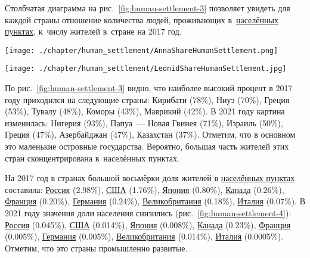 Столбчатая диаграмма на рис.~\ref{fig:human-settlement-3} позволяет увидеть для каждой страны 
отношение количества людей, 
проживающих в~\href{http://www.wikidata.org/entity/Q486972}{населённых пунктах}, 
к~числу жителей в~стране на 2017 год.

\begin{figure*}
    \texttt{[image: ./chapter/human\_settlement/AnnaShareHumanSettlement.png]}
	\label{fig:human-settlement-3}
	\caption[Диаграмма доли населения страны, 2017.]{Диаграмма доли населения страны, проживающего в <<населённых пунктах>> на 2017 год. Ссылка на SPARQL-запрос: \href{https://w.wiki/4dE3}{https://w.wiki/4dE3}}%
\end{figure*} 

\begin{figure*}
    \texttt{[image: ./chapter/human\_settlement/LeonidShareHumanSettlement.jpg]}
	\label{fig:human-settlement-4}
	\caption[Диаграмма доли населения страны, 2021.]{Диаграмма доли населения страны, проживающего в <<населённых пунктах>> на 2021 год. Были выбраны страны с населением более 5 млн чел. SPARQL-запрос: \href{https://w.wiki/4dDx}{https://w.wiki/4dDx}}%
\end{figure*} 

По рис.~\ref{fig:human-settlement-3} видно, 
что наиболее высокий процент в 2017 году приходился на следующие страны: 
Кирибати (78\%), Ниуэ (70\%), Греция (53\%), Тувалу (48\%), Коморы (43\%), Маврикий (42\%). 
В 2021 году картина изменилась: Нигерия (93\%), Папуа~--- Новая Гвинея (71\%), 
Израиль (50\%), Греция (47\%), Азербайджан (47\%), Казахстан (37\%). 
Отметим, что в основном это маленькие островные государства. 
Вероятно, большая часть жителей этих стран сконцентрирована в~населённых пунктах.

На 2017 год в странах большой восьмёрки доля жителей 
в \href{http://www.wikidata.org/entity/Q486972}{населённых пунктах} составила: 
\href{http://www.wikidata.org/entity/Q159}{Россия} (\num{2.98}\%), 
\href{http://www.wikidata.org/entity/Q30}{США} (\num{1.76}\%), 
\href{http://www.wikidata.org/entity/Q17}{Япония} (\num{0.80}\%), 
\href{http://www.wikidata.org/entity/Q16}{Канада} (\num{0.26}\%), 
\href{http://www.wikidata.org/entity/Q142}{Франция} (\num{0.20}\%), 
\href{http://www.wikidata.org/entity/Q183}{Германия} (\num{0.24}\%), 
\href{http://www.wikidata.org/entity/Q145}{Великобритания} (\num{0.18}\%), 
\href{http://www.wikidata.org/entity/Q38}{Италия} (\num{0.07}\%). 
В 2021 году значения доли населения снизились (рис.~\ref{fig:human-settlement-4}): 
\href{http://www.wikidata.org/entity/Q159}{Россия} (0.045\%), 
\href{http://www.wikidata.org/entity/Q30}{США} (\num{0.014}\%), 
\href{http://www.wikidata.org/entity/Q17}{Япония} (\num{0.008}\%), 
\href{http://www.wikidata.org/entity/Q16}{Канада} (\num{0.23}\%), 
\href{http://www.wikidata.org/entity/Q142}{Франция} (\num{0.005}\%), 
\href{http://www.wikidata.org/entity/Q183}{Германия} (\num{0.005}\%), 
\href{http://www.wikidata.org/entity/Q145}{Великобритания} (\num{0.014}\%), 
\href{http://www.wikidata.org/entity/Q38}{Италия} (\num{0.0005}\%). 
Отметим, что это страны промышленно развитые.


